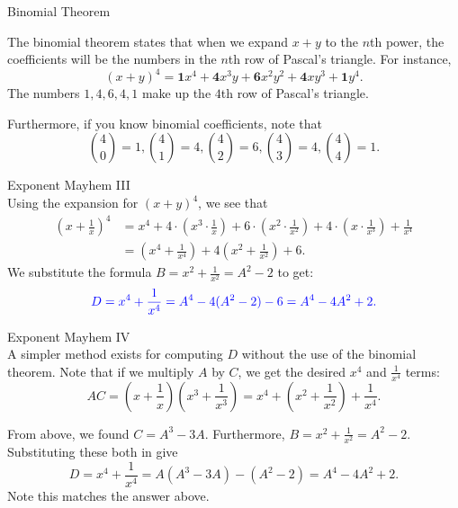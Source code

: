 \documentclass[xcolor=dvipsnames, fontsize=11pt, %
pagesize, %
parskip=half-, t]{beamer}
\begin{document}
\begin{frame}{Binomial Theorem}
	
	The binomial theorem states that when we expand $x+y$ to the $n$th power, the coefficients will be the numbers in the $n$th row of Pascal's triangle. For instance, $$(x+y)^4=\textbf{1}x^4+\textbf{4}x^3y+\textbf{6}x^2y^2+\textbf{4}xy^3+\textbf{1}y^4.$$
	The numbers $1, 4, 6, 4, 1$ make up the $4$th row of Pascal's triangle. \medskip 
	
	Furthermore, if you know binomial coefficients, note that $$\binom{4}{0}=1, \binom{4}{1}=4, \binom{4}{2}=6, \binom{4}{3}=4, \binom{4}{4}=1.$$
	
\end{frame}

\begin{frame}{Exponent Mayhem III}
	 ~\\
	
	Using the expansion for $(x+y)^4$, we see that \begin{align*} (x+\frac{1}{x})^4&=x^4+4\cdot \left(x^3\cdot \frac{1}{x}\right)+6\cdot \left(x^2\cdot \frac{1}{x^2}\right)+4\cdot \left(x\cdot \frac{1}{x^3}\right)+\frac{1}{x^4} \\ &= \left(x^4+\frac{1}{x^4}\right)+4\left(x^2+\frac{1}{x^2}\right)+6. \end{align*}
	We substitute the formula $B=x^2+\frac{1}{x^2}=A^2-2$ to get: $$\color{blue} D=x^4+\frac{1}{x^4}=A^4-4(A^2-2)-6=A^4-4A^2+2.$$ 
	
\end{frame}

\begin{frame}{Exponent Mayhem IV}
	 ~\\
	
	A simpler method exists for computing $D$ without the use of the binomial theorem. Note that if we multiply $A$ by $C$, we get the desired $x^4$ and $\frac{1}{x^4}$ terms: $$AC=\left(x+\frac{1}{x}\right)\left(x^3+\frac{1}{x^3}\right)=x^4+\left(x^2+\frac{1}{x^2}\right)+\frac{1}{x^4}.$$  
	
	From above, we found $C=A^3-3A$. Furthermore, $B=x^2+\frac{1}{x^2}=A^2-2$. Substituting these both in give $$D=x^4+\frac{1}{x^4}=A(A^3-3A)-(A^2-2)=A^4-4A^2+2.$$ Note this matches the answer above.  
	
\end{frame}
\end{document}
